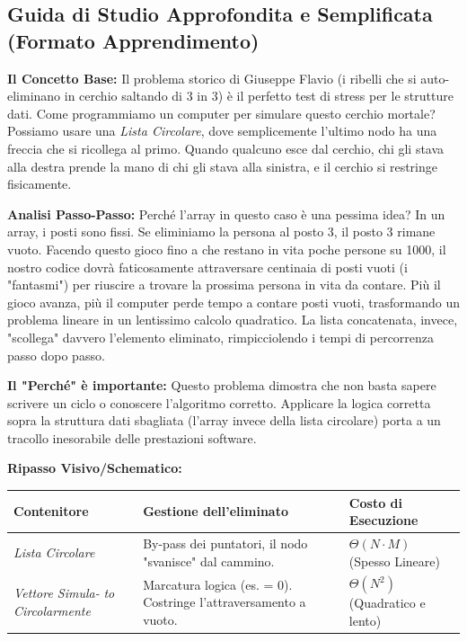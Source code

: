 \documentclass[a4paper, 11pt]{report}
\begin{document}
\vspace{0.5cm}
\subsection*{Guida di Studio Approfondita e Semplificata (Formato Apprendimento)}
\textbf{Il Concetto Base:}
Il problema storico di Giuseppe Flavio (i ribelli che si auto-eliminano in cerchio saltando di 3 in 3) è il perfetto test di stress per le strutture dati. Come programmiamo un computer per simulare questo cerchio mortale?
Possiamo usare una \textit{Lista Circolare}, dove semplicemente l'ultimo nodo ha una freccia che si ricollega al primo. Quando qualcuno esce dal cerchio, chi gli stava alla destra prende la mano di chi gli stava alla sinistra, e il cerchio si restringe fisicamente.

\textbf{Analisi Passo-Passo:}
Perché l'array in questo caso è una pessima idea?
In un array, i posti sono fissi. Se eliminiamo la persona al posto 3, il posto 3 rimane vuoto. Facendo questo gioco fino a che restano in vita poche persone su 1000, il nostro codice dovrà faticosamente attraversare centinaia di posti vuoti (i "fantasmi") per riuscire a trovare la prossima persona in vita da contare. Più il gioco avanza, più il computer perde tempo a contare posti vuoti, trasformando un problema lineare in un lentissimo calcolo quadratico.
La lista concatenata, invece, "scollega" davvero l'elemento eliminato, rimpicciolendo i tempi di percorrenza passo dopo passo.

\textbf{Il "Perché" è importante:}
Questo problema dimostra che non basta sapere scrivere un ciclo o conoscere l'algoritmo corretto. Applicare la logica corretta sopra la struttura dati sbagliata (l'array invece della lista circolare) porta a un tracollo inesorabile delle prestazioni software.

\textbf{Ripasso Visivo/Schematico:}
\begin{center}
\begin{tabular}{|p{3cm}|p{6cm}|p{5cm}|}
\hline
\textbf{Contenitore} & \textbf{Gestione dell'eliminato} & \textbf{Costo di Esecuzione} \\
\hline
\textit{Lista Circolare} & By-pass dei puntatori, il nodo "svanisce" dal cammino. & $\Theta(N \cdot M)$ (Spesso Lineare) \\
\hline
\textit{Vettore Simula-} \textit{to Circolarmente} & Marcatura logica (es. = 0). Costringe l'attraversamento a vuoto. & $\Theta(N^2)$ (Quadratico e lento) \\
\hline
\end{tabular}
\end{center}
\end{document}

